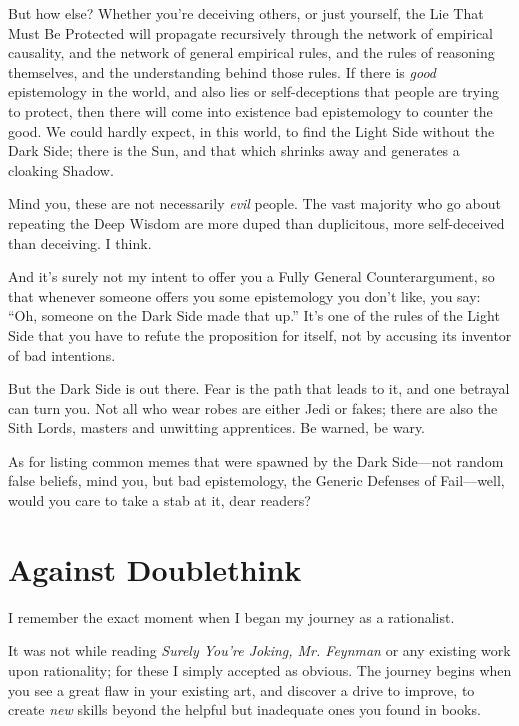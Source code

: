 {
 But how else? Whether you're deceiving others, or
just yourself, the Lie That Must Be Protected will propagate
recursively through the network of empirical causality, and the network
of general empirical rules, and the rules of reasoning themselves, and
the understanding behind those rules. If there is \textit{good}
epistemology in the world, and also lies or self-deceptions that people
are trying to protect, then there will come into existence bad
epistemology to counter the good. We could hardly expect, in this
world, to find the Light Side without the Dark Side; there is the Sun,
and that which shrinks away and generates a cloaking Shadow.}

{
 Mind you, these are not necessarily \textit{evil} people. The vast
majority who go about repeating the Deep Wisdom are more duped than
duplicitous, more self-deceived than deceiving. I think.}

{
 And it's surely not my intent to offer you a Fully
General Counterargument, so that whenever someone offers you some
epistemology you don't like, you say:
``Oh, someone on the Dark Side made that
up.'' It's one of the rules of the
Light Side that you have to refute the proposition for itself, not by
accusing its inventor of bad intentions.}

{
 But the Dark Side is out there. Fear is the path that leads to it,
and one betrayal can turn you. Not all who wear robes are either Jedi
or fakes; there are also the Sith Lords, masters and unwitting
apprentices. Be warned, be wary.}

{
 As for listing common memes that were spawned by the Dark
Side---not random false beliefs, mind you, but bad epistemology, the
Generic Defenses of Fail---well, would you care to take a stab at it,
dear readers?}

\myendsectiontext

\chapter{Against Doublethink}


{
 I remember the exact moment when I began my journey as a
rationalist. }

{
 It was not while reading \textit{Surely You're
Joking, Mr. Feynman} or any existing work upon rationality; for these I
simply accepted as obvious. The journey begins when you see a great
flaw in your existing art, and discover a drive to improve, to create
\textit{new} skills beyond the helpful but inadequate ones you found in
books.}

